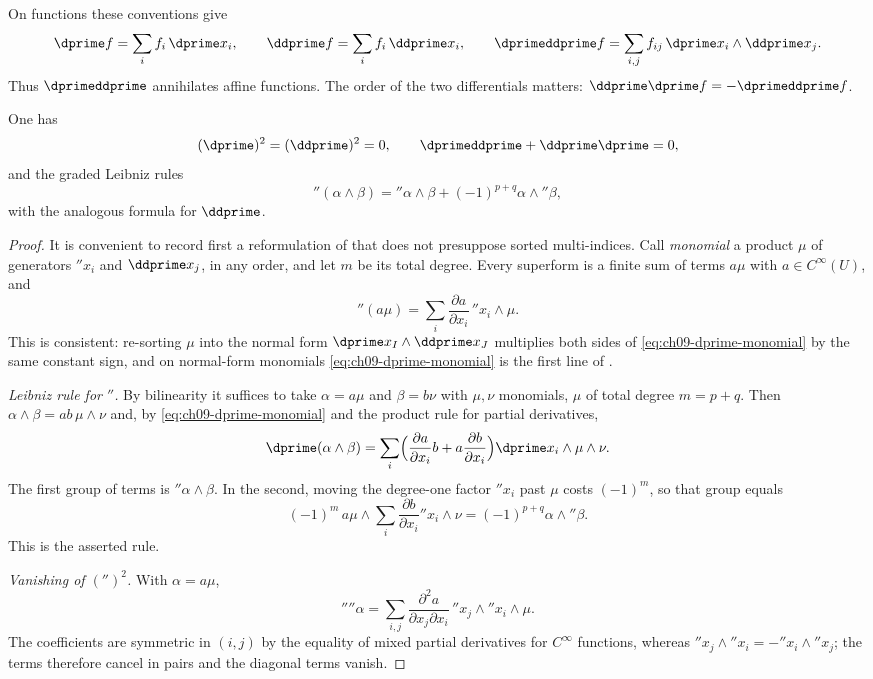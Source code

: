 On functions these conventions give
\[
 \dprime f=\sum_i f_i\,\dprime x_i,
 \qquad
 \ddprime f=\sum_i f_i\,\ddprime x_i,
 \qquad
 \dprimeddprime f=\sum_{i,j}f_{ij}\,
                 \dprime x_i\wedge\ddprime x_j.
\]
Thus $\dprimeddprime$ annihilates affine functions.  The order of the two
differentials matters: $\ddprime\dprime f=-\dprimeddprime f$.

\begin{proposition}
\label{prop:superform-differential-identities}
One has
\[
(\dprime)^2=(\ddprime)^2=0,\qquad \dprimeddprime+\ddprime\dprime=0,
\]
and the graded Leibniz rules
\[
\dprime(\alpha\wedge\beta)=\dprime\alpha\wedge\beta+
 (-1)^{p+q}\alpha\wedge \dprime\beta,
\]
with the analogous formula for $\ddprime$.
\end{proposition}
\begin{proof}
It is convenient to record first a reformulation of
 that does not presuppose sorted multi-indices.
Call \emph{monomial} a product $\mu$ of generators $\dprime x_i$ and
$\ddprime x_j$, in any order, and let $m$ be its total degree.  Every
superform is a finite sum of terms $a\mu$ with $a\in C^\infty(U)$, and
\begin{equation}
\label{eq:ch09-dprime-monomial}
 \dprime(a\mu)=\sum_i\frac{\partial a}{\partial x_i}\,\dprime x_i\wedge\mu .
\end{equation}
This is consistent: re-sorting $\mu$ into the normal form
$\dprime x_I\wedge\ddprime x_J$ multiplies both sides of
\eqref{eq:ch09-dprime-monomial} by the same constant sign, and on normal-form
monomials \eqref{eq:ch09-dprime-monomial} is the first line of
.

\emph{Leibniz rule for $\dprime$.}  By bilinearity it suffices to take
$\alpha=a\mu$ and $\beta=b\nu$ with $\mu,\nu$ monomials, $\mu$ of total
degree $m=p+q$.  Then $\alpha\wedge\beta=ab\,\mu\wedge\nu$ and, by
\eqref{eq:ch09-dprime-monomial} and the product rule for partial derivatives,
\[
 \dprime(\alpha\wedge\beta)
 =\sum_i\Bigl(\frac{\partial a}{\partial x_i}b
       +a\frac{\partial b}{\partial x_i}\Bigr)
     \dprime x_i\wedge\mu\wedge\nu .
\]
The first group of terms is $\dprime\alpha\wedge\beta$.  In the second,
moving the degree-one factor $\dprime x_i$ past $\mu$ costs $(-1)^m$, so that
group equals
\[
 (-1)^{m}\,a\mu\wedge\sum_i\frac{\partial b}{\partial x_i}\dprime x_i\wedge\nu
 =(-1)^{p+q}\alpha\wedge\dprime\beta .
\]
This is the asserted rule.

\emph{Vanishing of $(\dprime)^2$.}  With $\alpha=a\mu$,
\[
 \dprime\dprime\alpha
 =\sum_{i,j}\frac{\partial^2a}{\partial x_j\partial x_i}\,
   \dprime x_j\wedge\dprime x_i\wedge\mu .
\]
The coefficients are symmetric in $(i,j)$ by the equality of mixed partial
derivatives for $C^\infty$ functions, whereas
$\dprime x_j\wedge\dprime x_i=-\dprime x_i\wedge\dprime x_j$; the terms
therefore cancel in pairs and the diagonal terms vanish.


\end{proof}
